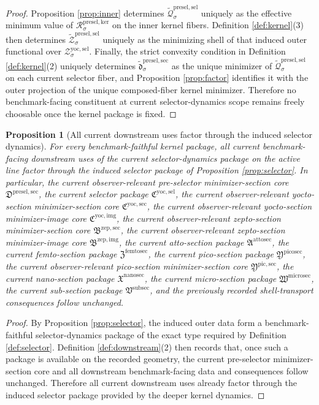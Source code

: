 \documentclass[11pt]{article}
\newcommand{\SubSectionPackage}{\mathfrak V^{\mathrm{subsec}}}
\newcommand{\MicroSectionPackage}{\mathfrak W^{\mathrm{microsec}}}
\newcommand{\NanoSectionPackage}{\mathfrak X^{\mathrm{nanosec}}}
\newcommand{\PicoSectionPackage}{\mathfrak Y^{\mathrm{picosec}}}
\newcommand{\PicoMinSectionCore}{\mathfrak Y^{\mathrm{pic,sec}}}
\newcommand{\FemtoSectionPackage}{\mathfrak Z^{\mathrm{femtosec}}}
\newcommand{\AttoSectionPackage}{\mathfrak A^{\mathrm{attosec}}}
\newcommand{\ZeptoImageCore}{\mathfrak B^{\mathrm{zep,img}}}
\newcommand{\ZeptoMinSectionCore}{\mathfrak B^{\mathrm{zep,sec}}}
\newcommand{\YoctoImageCore}{\mathfrak C^{\mathrm{yoc,img}}}
\newcommand{\YoctoMinSectionCore}{\mathfrak C^{\mathrm{yoc,sec}}}
\newcommand{\YoctoSelectorPackage}{\mathfrak C^{\mathrm{yoc,sel}}}
\newcommand{\YoctoSelectorShell}[1]{\mathcal Z_{#1}^{\mathrm{yoc,sel}}}
\newcommand{\PreSelectorMinSectionCore}{\mathfrak D^{\mathrm{presel,sec}}}
\newcommand{\KernelFunctional}[1]{\mathscr R_{#1}^{\mathrm{presel,ker}}}
\newcommand{\InducedSelectorFunctional}[1]{\widetilde{\mathscr Q}_{#1}^{\mathrm{presel,sel}}}
\newcommand{\InducedSelectorShell}[1]{\widetilde{\mathcal Z}_{#1}^{\mathrm{presel,sel}}}
\newcommand{\InducedPreSelectorMinSection}[1]{\widetilde{\mathfrak d}_{#1}^{\mathrm{presel,sec}}}
\newtheorem{proposition}{Proposition}
\begin{document}
\begin{proof}
Proposition \ref{prop:inner} determines \(\InducedSelectorFunctional{\sigma}\) uniquely as the effective minimum value of \(\KernelFunctional{\sigma}\) on the inner kernel fibers. Definition \ref{def:kernel}(3) then determines \(\InducedSelectorShell{\sigma}\) uniquely as the minimizing shell of that induced outer functional over \(\YoctoSelectorShell{\sigma}\). Finally, the strict convexity condition in Definition \ref{def:kernel}(2) uniquely determines \(\InducedPreSelectorMinSection{\sigma}\) as the unique minimizer of \(\InducedSelectorFunctional{\sigma}\) on each current selector fiber, and Proposition \ref{prop:factor} identifies it with the outer projection of the unique composed-fiber kernel minimizer. Therefore no benchmark-facing constituent at current selector-dynamics scope remains freely choosable once the kernel package is fixed.
\end{proof}

\begin{proposition}[All current downstream uses factor through the induced selector dynamics]
\label{prop:downstream}
For every benchmark-faithful kernel package, all current benchmark-facing downstream uses of the current selector-dynamics package on the active line factor through the induced selector package of Proposition \ref{prop:selector}. In particular, the current observer-relevant pre-selector minimizer-section core \(\PreSelectorMinSectionCore\), the current selector package \(\YoctoSelectorPackage\), the current observer-relevant yocto-section minimizer-section core \(\YoctoMinSectionCore\), the current observer-relevant yocto-section minimizer-image core \(\YoctoImageCore\), the current observer-relevant zepto-section minimizer-section core \(\ZeptoMinSectionCore\), the current observer-relevant zepto-section minimizer-image core \(\ZeptoImageCore\), the current atto-section package \(\AttoSectionPackage\), the current femto-section package \(\FemtoSectionPackage\), the current pico-section package \(\PicoSectionPackage\), the current observer-relevant pico-section minimizer-section core \(\PicoMinSectionCore\), the current nano-section package \(\NanoSectionPackage\), the current micro-section package \(\MicroSectionPackage\), the current sub-section package \(\SubSectionPackage\), and the previously recorded shell-transport consequences follow unchanged.
\end{proposition}

\begin{proof}
By Proposition \ref{prop:selector}, the induced outer data form a benchmark-faithful selector-dynamics package of the exact type required by Definition \ref{def:selector}. Definition \ref{def:downstream}(2) then records that, once such a package is available on the recorded geometry, the current pre-selector minimizer-section core and all downstream benchmark-facing data and consequences follow unchanged. Therefore all current downstream uses already factor through the induced selector package provided by the deeper kernel dynamics.
\end{proof}
\end{document}
